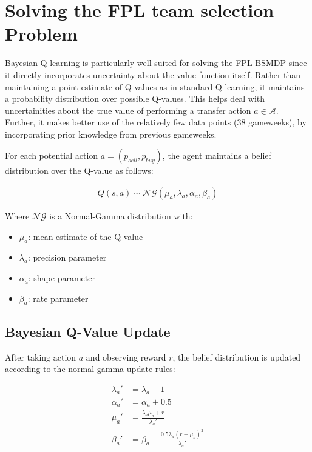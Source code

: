 \section{Solving the FPL team selection Problem}
Bayesian Q-learning is particularly well-suited for solving the FPL BSMDP since it directly incorporates uncertainty about the value function itself. Rather than maintaining a point estimate of Q-values as in standard Q-learning, it maintains a probability distribution over possible Q-values. This helps deal with uncertainities about the true value of performing a transfer action $a \in \mathcal{A}$. Further, it makes better use of the relatively few data points (38 gameweeks), by incorporating prior knowledge from previous gameweeks.

For each potential action $a = (p_{sell}, p_{buy})$, the agent maintains a belief distribution over the Q-value as follows:

\begin{align}
    Q(s, a) \sim \mathcal{NG}(\mu_{a}, \lambda_{a}, \alpha_{a}, \beta_{a})
\end{align}

Where $\mathcal{NG}$ is a Normal-Gamma distribution with:
\begin{itemize}
    \item $\mu_{a}$: mean estimate of the Q-value
    \item $\lambda_{a}$: precision parameter
    \item $\alpha_{a}$: shape parameter
    \item $\beta_{a}$: rate parameter
\end{itemize}

\subsection{Bayesian Q-Value Update}

After taking action $a$ and observing reward $r$, the belief distribution is updated according to the normal-gamma update rules:

\begin{align}
\lambda_{a}' &= \lambda_{a} + 1\\
\alpha_{a}' &= \alpha_{a} + 0.5\\
\mu_{a}' &= \frac{\lambda_{a} \mu_{a} + r}{\lambda_{a}'}\\
\beta_{a}' &= \beta_{a} + \frac{0.5 \lambda_{a} (r - \mu_{a})^2}{\lambda_{a}'}
\end{align}

